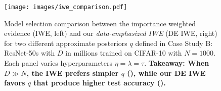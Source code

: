 \begin{figure}[htbp!]
  \centering
  \texttt{[image: images/iwe\_comparison.pdf]}
  \caption{Model selection comparison between the importance weighted evidence (IWE, left) and our \emph{data-emphasized IWE} (DE IWE, right) for two different approximate posteriors $q$ defined in Case Study B: ResNet-50s with $D$ in millions trained on CIFAR-10 with $N=1000$. Each panel varies hyperparameters $\eta = \lambda = \tau$.
  \textbf{Takeaway: When $D \gg N$, the IWE prefers simpler $q$ (), while our DE IWE favors $q$ that produce higher test accuracy ().}}
  \label{fig:iwe_comparison}
\end{figure}